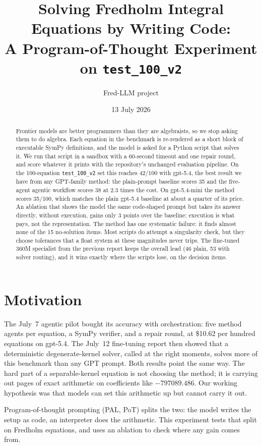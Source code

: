 \documentclass[11pt]{article}
\title{Solving Fredholm Integral Equations by Writing Code:\\
\large A Program-of-Thought Experiment on \texttt{test\_100\_v2}}
\author{Fred-LLM project}
\date{13 July 2026}
\begin{document}
\maketitle

\begin{abstract}
\noindent
Frontier models are better programmers than they are algebraists, so we stop
asking them to do algebra. Each equation in the benchmark is re-rendered as a
short block of executable SymPy definitions, and the model is asked for a
Python script that solves it. We run that script in a sandbox with a 60-second
timeout and one repair round, and score whatever it prints with the
repository's unchanged evaluation pipeline. On the 100-equation
\texttt{test\_100\_v2} set this reaches 42/100 with gpt-5.4, the best result
we have from any GPT-family method: the plain-prompt baseline scores 35 and
the five-agent agentic workflow scores 38 at 2.3 times the cost. On
gpt-5.4-mini the method scores 35/100, which matches the plain gpt-5.4
baseline at about a quarter of its price. An ablation that shows the model the
same code-shaped prompt but takes its answer directly, without execution,
gains only 3 points over the baseline; execution is what pays, not the
representation. The method has one systematic failure: it finds almost none of
the 15 no-solution items. Most scripts do attempt a singularity check, but
they choose tolerances that a float system at these magnitudes never trips. The fine-tuned 360M specialist from the
previous report keeps the overall lead (46 plain, 53 with solver routing),
and it wins exactly where the scripts lose, on the decision items.
\end{abstract}

\section{Motivation}
The July~7 agentic pilot bought its accuracy with orchestration: five method
agents per equation, a SymPy verifier, and a repair round, at \$10.62 per
hundred equations on gpt-5.4. The July~12 fine-tuning report then showed that
a deterministic degenerate-kernel solver, called at the right moments, solves
more of this benchmark than any GPT prompt. Both results point the same way.
The hard part of a separable-kernel equation is not choosing the method; it is
carrying out pages of exact arithmetic on coefficients like
$-797089.486$. Our working hypothesis was that models can set this
arithmetic up but cannot carry it out.

Program-of-thought prompting (PAL, PoT) splits the two: the model writes the
setup as code, an interpreter does the arithmetic. This experiment tests that
split on Fredholm equations, and uses an ablation to check where any gain
comes from.
\end{document}
